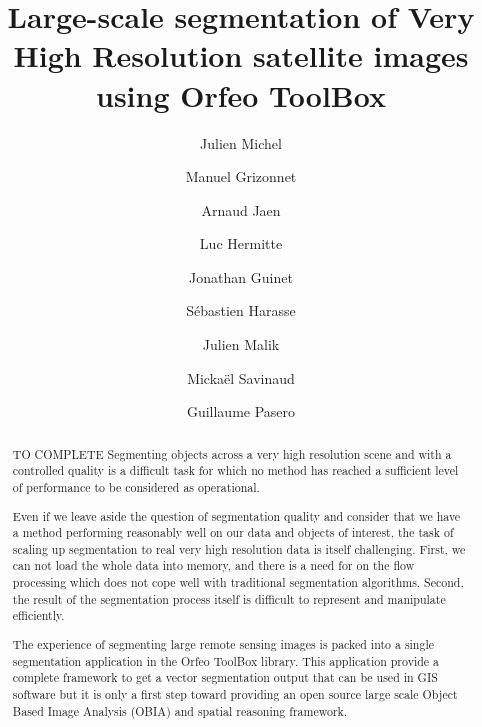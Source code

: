 \documentclass{josis}
\begin{document}
\title{Large-scale segmentation of Very High Resolution satellite images using Orfeo ToolBox}

\author{Julien Michel}
\author{Manuel Grizonnet}
\author{Arnaud Jaen}
\author{Luc Hermitte}
\author{Jonathan Guinet}
\author{S\'ebastien Harasse}
\author{Julien Malik}
\author{Micka\"el Savinaud}
\author{Guillaume Pasero}


\maketitle


\begin{abstract}
TO COMPLETE
Segmenting objects across a very high resolution scene and with a controlled
quality is a difficult task for which no method has reached a sufficient level
of performance to be considered as operational.

Even if we leave aside the question of segmentation quality and consider that we
have a method performing reasonably well on our data and objects of interest,
the task of scaling up segmentation to real very high resolution data is itself
challenging. First, we can not load the whole data into memory, and there is a
need for on the flow processing which does not cope well with traditional
segmentation algorithms. Second, the result of the segmentation process itself
is difficult to represent and manipulate efficiently.

The experience of segmenting large remote sensing images is packed
into a single segmentation application in the Orfeo ToolBox
library. This application provide a complete framework to get a vector
segmentation output that can be used in GIS software but it is only a
first step toward providing an open source large scale Object Based
Image Analysis (OBIA) and spatial reasoning framework.

\end{abstract}


\end{document}
